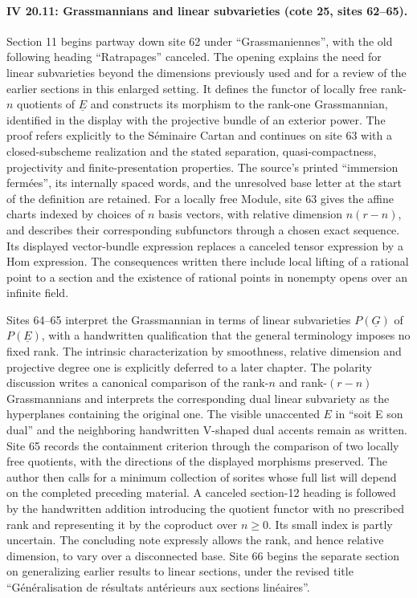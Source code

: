 \documentclass[10pt,a4paper]{article}
\begin{document}
\paragraph{IV 20.11: Grassmannians and linear subvarieties (cote 25, sites 62--65).}
Section 11 begins partway down site 62 under ``Grassmaniennes'', with the old following heading ``Ratrapages'' canceled. The opening explains the need for linear subvarieties beyond the dimensions previously used and for a review of the earlier sections in this enlarged setting. It defines the functor of locally free rank-$n$ quotients of $\underline E$ and constructs its morphism to the rank-one Grassmannian, identified in the display with the projective bundle of an exterior power. The proof refers explicitly to the S\'eminaire Cartan and continues on site 63 with a closed-subscheme realization and the stated separation, quasi-compactness, projectivity and finite-presentation properties. The source's printed ``immersion ferm\'ees'', its internally spaced words, and the unresolved base letter at the start of the definition are retained. For a locally free Module, site 63 gives the affine charts indexed by choices of $n$ basis vectors, with relative dimension $n(r-n)$, and describes their corresponding subfunctors through a chosen exact sequence. Its displayed vector-bundle expression replaces a canceled tensor expression by a Hom expression. The consequences written there include local lifting of a rational point to a section and the existence of rational points in nonempty opens over an infinite field.

Sites 64--65 interpret the Grassmannian in terms of linear subvarieties $P(\underline G)$ of $P(\underline E)$, with a handwritten qualification that the general terminology imposes no fixed rank. The intrinsic characterization by smoothness, relative dimension and projective degree one is explicitly deferred to a later chapter. The polarity discussion writes a canonical comparison of the rank-$n$ and rank-$(r-n)$ Grassmannians and interprets the corresponding dual linear subvariety as the hyperplanes containing the original one. The visible unaccented $E$ in ``soit E son dual'' and the neighboring handwritten V-shaped dual accents remain as written. Site 65 records the containment criterion through the comparison of two locally free quotients, with the directions of the displayed morphisms preserved. The author then calls for a minimum collection of sorites whose full list will depend on the completed preceding material. A canceled section-12 heading is followed by the handwritten addition introducing the quotient functor with no prescribed rank and representing it by the coproduct over $n\geq0$. Its small index is partly uncertain. The concluding note expressly allows the rank, and hence relative dimension, to vary over a disconnected base. Site 66 begins the separate section on generalizing earlier results to linear sections, under the revised title ``Généralisation de résultats antérieurs aux sections linéaires''.
\par{}
\end{document}
